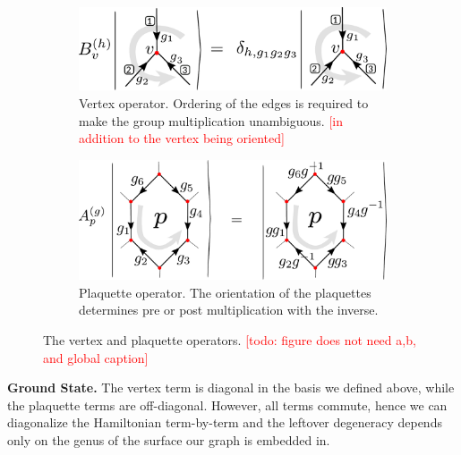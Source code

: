 \documentclass[two column]{article}
\newcommand{\caro}[1]{\textcolor{red}{[#1]}}
\begin{document}
\begin{figure}
    \centering
    \begin{subfigure}[b]{0.45\textwidth}
        \centering
        \includegraphics[width= \linewidth]{Figures/B_ops.pdf}
        \caption{Vertex operator. Ordering of the edges is required to make the group multiplication unambiguous. \caro{in addition to the vertex being oriented}}
        \label{eqn:Bs_def}
    \end{subfigure}\hfill
    \begin{subfigure}[b]{0.45\textwidth}
        \centering
        \includegraphics[width = \linewidth]{Figures/A_ops.pdf}
        \caption{Plaquette operator. The orientation of the plaquettes determines pre or post multiplication with the inverse.}
        \label{eqn:As_def}
    \end{subfigure}\hfill
    \caption{The vertex and plaquette operators. \caro{todo: figure does not need a,b, and global caption}}
    \label{fig:vertex_ops}
\end{figure}



\textbf{Ground State.} The vertex term is diagonal in the basis we defined above, while the plaquette terms are off-diagonal.
However, all terms commute, hence we can diagonalize the Hamiltonian term-by-term and the leftover degeneracy depends only on the genus of the surface our graph is embedded in\cite{Kitaev_2003, cui2018topological}.


\end{document}
